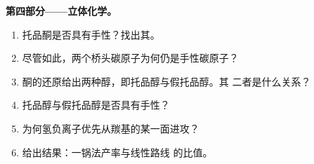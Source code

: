 \begin{problem}
\medskip\noindent\textbf{第四部分——立体化学。}
\begin{enumerate}[resume]
  \item 托品酮是否具有手性？找出其。
  \item 尽管如此，两个桥头碳原子为何仍是手性碳原子？
  \item 酮的还原给出两种醇，即托品醇与假托品醇。其
        二者是什么关系？
  \item 托品醇与假托品醇是否具有手性？
  \item 为何氢负离子优先从羰基的某一面进攻？
  \item 给出结果：一锅法产率与线性路线
        的比值。
\end{enumerate}
\end{problem}
